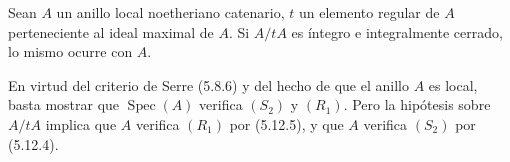 
\begin{corollary}[5.12.7]
\label{IV.2.s5.12.7-fr}
Sean $A$ un anillo local noetheriano catenario, $t$ un elemento regular de
$A$ perteneciente al ideal maximal de $A$. Si $A/tA$ es íntegro e
integralmente cerrado, lo mismo ocurre con $A$.
\end{corollary}

En virtud del criterio de Serre (5.8.6) y del hecho de que el anillo $A$ es
local, basta mostrar que $\operatorname{Spec}(A)$ verifica $(S_2)$ y $(R_1)$.
Pero la hipótesis sobre $A/tA$ implica que $A$ verifica $(R_1)$ por (5.12.5), y
que $A$ verifica $(S_2)$ por (5.12.4).
